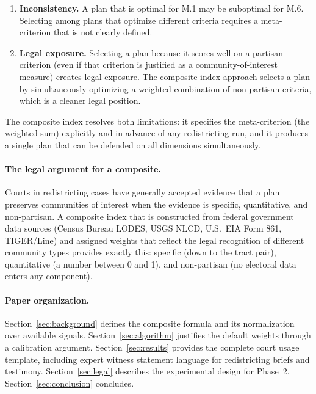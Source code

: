 \begin{enumerate}
  \item \textbf{Inconsistency.}
    A plan that is optimal for M.1 may be suboptimal for M.6.
    Selecting among plans that optimize different criteria requires
    a meta-criterion that is not clearly defined.
  \item \textbf{Legal exposure.}
    Selecting a plan because it scores well on a partisan criterion
    (even if that criterion is justified as a community-of-interest
    measure) creates legal exposure.
    The composite index approach selects a plan by simultaneously
    optimizing a weighted combination of non-partisan criteria,
    which is a cleaner legal position.
\end{enumerate}

The composite index resolves both limitations: it specifies the
meta-criterion (the weighted sum) explicitly and in advance of any
redistricting run, and it produces a single plan that can be defended
on all dimensions simultaneously.

\paragraph{The legal argument for a composite.}
Courts in redistricting cases have generally accepted evidence that a plan
preserves communities of interest when the evidence is specific, quantitative,
and non-partisan.
A composite index that is constructed from federal government data sources
(Census Bureau LODES, USGS NLCD, U.S.\ EIA Form 861, TIGER/Line) and
assigned weights that reflect the legal recognition of different community
types provides exactly this: specific (down to the tract pair), quantitative
(a number between 0 and 1), and non-partisan (no electoral data enters any
component).

\paragraph{Paper organization.}
Section~\ref{sec:background} defines the composite formula and its
normalization over available signals.
Section~\ref{sec:algorithm} justifies the default weights through a
calibration argument.
Section~\ref{sec:results} provides the complete court usage template,
including expert witness statement language for redistricting briefs
and testimony.
Section~\ref{sec:legal} describes the experimental design for Phase~2.
Section~\ref{sec:conclusion} concludes.
